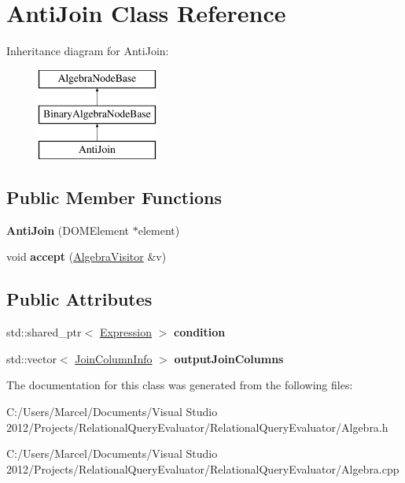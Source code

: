 \hypertarget{class_anti_join}{\section{Anti\+Join Class Reference}
\label{class_anti_join}
}
Inheritance diagram for Anti\+Join\+:\begin{figure}[H]
\begin{center}
\leavevmode
\includegraphics[height=3.000000cm]{class_anti_join}
\end{center}
\end{figure}
\subsection*{Public Member Functions}
\begin{DoxyCompactItemize}
\item 
\hypertarget{class_anti_join_a5cc6257a7d3b85eebc2326e2a5996dec}{{\bfseries Anti\+Join} (D\+O\+M\+Element $\ast$element)}\label{class_anti_join_a5cc6257a7d3b85eebc2326e2a5996dec}

\item 
\hypertarget{class_anti_join_a95d753b1ed036be43a4fe00b40b775cf}{void {\bfseries accept} (\hyperlink{class_algebra_visitor}{Algebra\+Visitor} \&v)}\label{class_anti_join_a95d753b1ed036be43a4fe00b40b775cf}

\end{DoxyCompactItemize}
\subsection*{Public Attributes}
\begin{DoxyCompactItemize}
\item 
\hypertarget{class_anti_join_a55e3da2742c4a24af7eee18cc5309206}{std\+::shared\+\_\+ptr$<$ \hyperlink{class_expression}{Expression} $>$ {\bfseries condition}}\label{class_anti_join_a55e3da2742c4a24af7eee18cc5309206}

\item 
\hypertarget{class_anti_join_af033e50994f2155c9f33926ec2ecd375}{std\+::vector$<$ \hyperlink{class_join_column_info}{Join\+Column\+Info} $>$ {\bfseries output\+Join\+Columns}}\label{class_anti_join_af033e50994f2155c9f33926ec2ecd375}

\end{DoxyCompactItemize}


The documentation for this class was generated from the following files\+:\begin{DoxyCompactItemize}
\item 
C\+:/\+Users/\+Marcel/\+Documents/\+Visual Studio 2012/\+Projects/\+Relational\+Query\+Evaluator/\+Relational\+Query\+Evaluator/Algebra.\+h\item 
C\+:/\+Users/\+Marcel/\+Documents/\+Visual Studio 2012/\+Projects/\+Relational\+Query\+Evaluator/\+Relational\+Query\+Evaluator/Algebra.\+cpp\end{DoxyCompactItemize}
